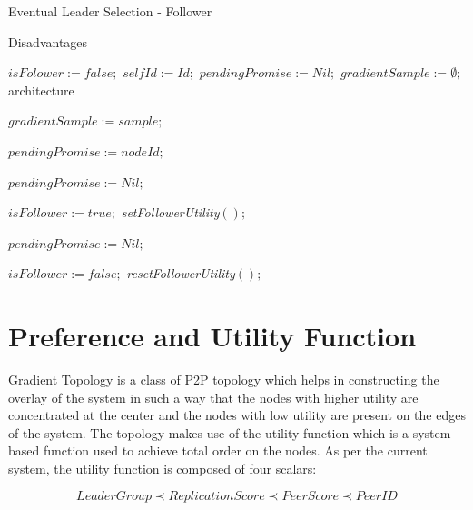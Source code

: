 \documentclass[a4paper,11pt]{kth-mag}
\begin{document}
\begin{algorithm}[h]
\caption{Eventual Leader Selection - Follower}
\label{follower}Disadvantages
\begin{algorithmic}[1]

  \State $isFolower := false;$
  \State $selfId := Id;$ $pendingPromise := Nil;$
  \State $gradientSample := \emptyset;$architecture
\EndUponS

  \State $gradientSample := sample;$
 \EndUpon

    \State $pendingPromise := nodeId;$
    \EndTrigger
    \TriggerS[promiseTimeout]{}\EndTriggerS
  \Else
     \EndTrigger
  \EndIf
\EndUpon

\UponS[promiseTimeout]{}
  \State $pendingPromise := Nil;$
\EndUponS

    \TriggerS[followerLeaseTimeout]{}\EndTriggerS
    \TriggerS[cancelPromiseTimeout]{}\EndTriggerS
    \State $isFollower := true;$
    \State \emph{setFollowerUtility}$();$
  \EndIf
\EndUpon

\UponS[promiseTimeout]{}
  \State $pendingPromise := Nil;$
\EndUponS

\UponS[leaseTimeout]{}
  \State $isFollower := false;$
  \State \emph{resetFollowerUtility}$();$
\EndUponS

\end{algorithmic}
\end{algorithm}





\section{Preference and Utility Function}
\label{ssec:utility}

Gradient Topology is a class of P2P topology which helps in constructing the overlay of the system in such a way that the nodes with higher utility are concentrated at the center and the nodes with low utility are present on the edges of the system. The topology makes use of the utility function which is a system based function used to achieve total order on the nodes. As per the current system, the utility function is composed of four scalars:

\small
\begin{equation*}
    LeaderGroup \prec ReplicationScore \prec PeerScore \prec PeerID
\end{equation*}
\normalsize
\end{document}

